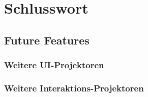 \chapter{Schlusswort}


\section{Future Features}


\subsection{Weitere UI-Projektoren}


\subsection{Weitere Interaktions-Projektoren}